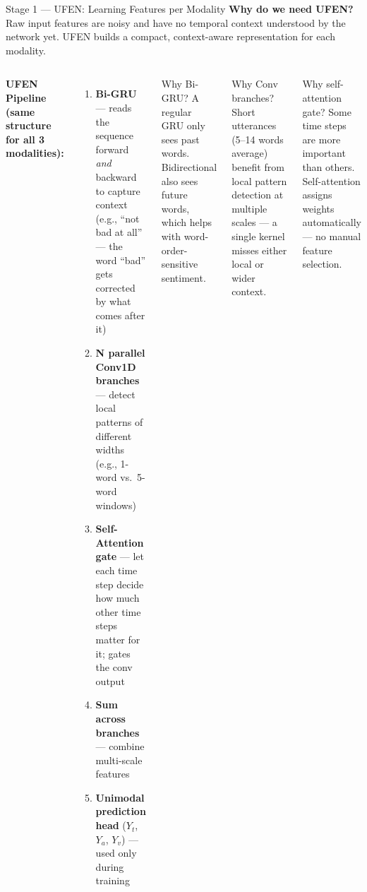 \documentclass[aspectratio=169]{beamer}
\begin{document}
\begin{frame}{Stage 1 — UFEN: Learning Features per Modality}
  \textbf{Why do we need UFEN?} Raw input features are noisy and have no temporal
  context understood by the network yet. UFEN builds a compact, context-aware
  representation for each modality.

  \bigskip

  \begin{columns}[T]
      \textbf{UFEN Pipeline (same structure for all 3 modalities):}
      \begin{enumerate}
        \item \textbf{Bi-GRU} — reads the sequence forward \emph{and} backward
          to capture context (e.g., ``not bad at all'' — the word ``bad'' gets
          corrected by what comes after it)
        \item \textbf{N parallel Conv1D branches} — detect local patterns of
          different widths (e.g., 1-word vs.\ 5-word windows)
        \item \textbf{Self-Attention gate} — let each time step decide how
          much other time steps matter for it; gates the conv output
        \item \textbf{Sum across branches} — combine multi-scale features
        \item \textbf{Unimodal prediction head} ($Y_t$, $Y_a$, $Y_v$) — used
          only during training
      \end{enumerate}

      \begin{block}{Why Bi-GRU?}
        \small A regular GRU only sees past words. Bidirectional also sees
        future words, which helps with word-order-sensitive sentiment.
      \end{block}
      \vspace{6pt}
      \begin{block}{Why Conv branches?}
        \small Short utterances (5--14 words average) benefit from local
        pattern detection at multiple scales — a single kernel misses either
        local or wider context.
      \end{block}
      \vspace{6pt}
      \begin{block}{Why self-attention gate?}
        \small Some time steps are more important than others. Self-attention
        assigns weights automatically — no manual feature selection.
      \end{block}
  \end{columns}
\end{frame}
\end{document}
